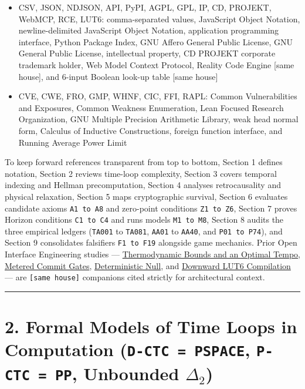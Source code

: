\documentclass[10pt,letterpaper]{article}
\begin{document}
\begin{itemize}
  Frequency Anomaly Atlas entry identifiers
  (\texttt{data/\allowbreak{}anomaly-\allowbreak{}atlas.\allowbreak{}csv})
\item
  CSV, JSON, NDJSON, API, PyPI, AGPL, GPL, IP, CD, PROJEKT, WebMCP,
  RCE, LUT6: comma-separated values, JavaScript Object Notation,
  newline-delimited JavaScript Object Notation, application programming
  interface, Python Package Index, GNU Affero General Public License,
  GNU General Public License, intellectual property, CD PROJEKT
  corporate trademark holder, Web Model Context Protocol, Reality Code
  Engine {[}same house{]}, and 6-input Boolean look-up table {[}same
  house{]}
\item
  CVE, CWE, FRO, GMP, WHNF, CIC, FFI, RAPL: Common Vulnerabilities and
  Exposures, Common Weakness Enumeration, Lean Focused Research
  Organization, GNU Multiple Precision Arithmetic Library, weak head
  normal form, Calculus of Inductive Constructions, foreign function
  interface, and Running Average Power Limit
\end{itemize}

To keep forward references transparent from top to bottom, Section 1
defines notation, Section 2 reviews time-loop complexity, Section 3
covers temporal indexing and Hellman precomputation, Section 4 analyses
retrocausality and physical relaxation, Section 5 maps cryptographic
survival, Section 6 evaluates candidate axioms \texttt{A1\ to\ A8} and
zero-point conditions \texttt{Z1\ to\ Z6}, Section 7 proves Horizon
conditions \texttt{C1\ to\ C4} and runs models \texttt{M1\ to\ M8},
Section 8 audits the three empirical ledgers (\texttt{TA001} to
\texttt{TA081}, \texttt{AA01} to \texttt{AA40}, and
\texttt{P01\ to\ P74}), and Section 9 consolidates falsifiers
\texttt{F1\ to\ F19} alongside game mechanics. Prior Open Interface
Engineering studies ---
\href{https://research.openie.dev/papers/agency/}{Thermodynamic Bounds
and an Optimal Tempo},
\href{https://research.openie.dev/papers/gates/}{Metered Commit Gates},
\href{https://research.openie.dev/papers/deterministic-null/}{Deterministic
Null}, and \href{https://research.openie.dev/papers/lut-adapt/}{Downward
LUT6 Compilation} --- are \texttt{{[}same\ house{]}} companions cited
strictly for architectural context.

\begin{center}\rule{0.5\linewidth}{0.5pt}\end{center}

\section{\texorpdfstring{2. Formal Models of Time Loops in Computation
(\texttt{D-\allowbreak{}CTC\ =\ PSPACE}, \texttt{P-\allowbreak{}CTC\ =\ PP}, Unbounded
\(\Delta_2\))}{2. Formal Models of Time Loops in Computation (D-CTC = PSPACE, P-CTC = PP, Unbounded \textbackslash Delta\_2)}}\label{formal-models-of-time-loops-in-computation-d-ctc-pspace-p-ctc-pp-unbounded-delta_2}
\end{document}

